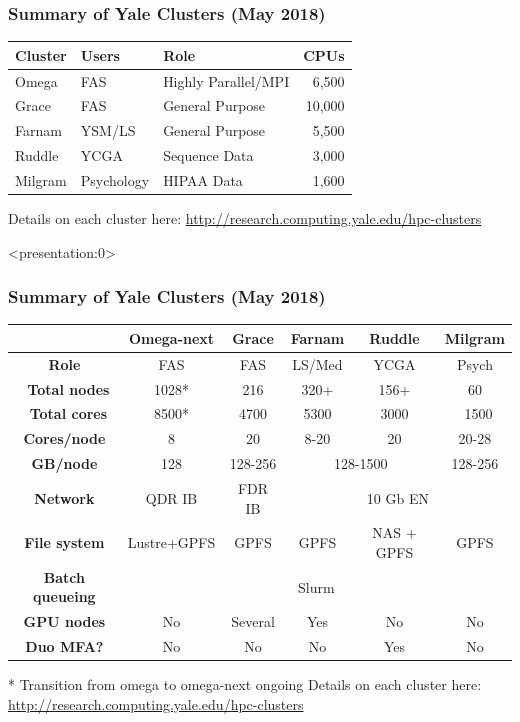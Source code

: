 \documentclass[10pt]{beamer}
\newcommand\smallfont{\fontsize{8pt}{7.2}\selectfont}
\newcommand\regfont{\fontsize{10pt}{7.2}\selectfont}
\begin{document}
\begin{frame}[fragile]
\frametitle{Summary of Yale Clusters (May 2018)}
\begin{tabular}{|l|l|l|r|}
\textbf{Cluster} & \bf{Users} & \textbf{Role} & \textbf{CPUs} \\
\hline
Omega & FAS & Highly Parallel/MPI & 6,500 \\ 
Grace & FAS & General Purpose & 10,000 \\
Farnam & YSM/LS & General Purpose & 5,500 \\
Ruddle & YCGA & Sequence Data & 3,000 \\ 
Milgram & Psychology & HIPAA Data & 1,600 \\
\end{tabular}
\regfont
\vskip 10pt
Details on each cluster here:
\url{http://research.computing.yale.edu/hpc-clusters}

\end{frame}

\begin{frame}<presentation:0>
\frametitle{Summary of Yale Clusters (May 2018)}
\smallfont
\begin{tabular}{|c|c|c|c|c|c|}
\hline
& \textbf{Omega-next} & \textbf{Grace}& \textbf{Farnam} & \textbf{Ruddle} & \textbf{Milgram} \\
\hline
\textbf{Role} & FAS & FAS & LS/Med & YCGA & Psych \\
\hline
\textbf{~Total nodes} & 1028* & 216 & 320+ & 156+ & 60 \\
\hline
\textbf{~Total cores} & 8500* & 4700 & 5300 & 3000 & ~1500 \\
\hline
\textbf{Cores/node} & 8 & 20 & 8-20 & 20 & 20-28 \\
\hline
\textbf{GB/node} & 128 & 128-256 & \multicolumn{2}{|c|}{128-1500} & 128-256 \\
\hline
\textbf{Network} & QDR IB & FDR IB & \multicolumn{3}{|c|}{10 Gb EN}   \\
\hline
\textbf{File system} & Lustre+GPFS & GPFS & GPFS & NAS + GPFS & GPFS \\
\hline
\textbf{Batch queueing} & \multicolumn{5}{|c|}{Slurm}  \\
\hline
\textbf{GPU nodes} & No & Several & Yes & No & No \\
\hline
\textbf{Duo MFA?} & No & No & No & Yes & No \\
\hline
\end{tabular}
\regfont
\vskip10pt
* Transition from omega to omega-next ongoing
\vskip 10pt
Details on each cluster here:
\url{http://research.computing.yale.edu/hpc-clusters}

\end{frame}
\end{document}
